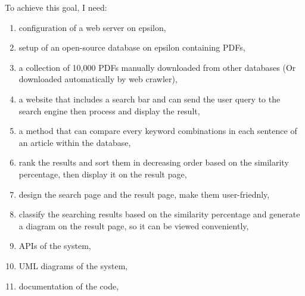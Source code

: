 
  To achieve this goal, I need:
\begin{enumerate}
  \item configuration of a web server on epsilon,
  \item setup of an open-source database on epsilon containing PDFs,
  \item a collection of 10,000 PDFs manually downloaded from other databases (Or downloaded automatically by web crawler),
  \item a website that includes a search bar and can send the user query to the search engine then process and display the result,
  \item a method that can compare every keyword combinations in each sentence of an article within the database,
  \item rank the results and sort them in decreasing order based on the similarity percentage, then display it on the result page,
  \item design the search page and the result page, make them  user-friednly,
  \item classify the searching results based on the similarity percentage and generate a diagram on the result page, so it can be viewed conveniently,
  \item APIs of the system,
  \item UML diagrams of the system,
  \item documentation of the code, 
\end{enumerate}
